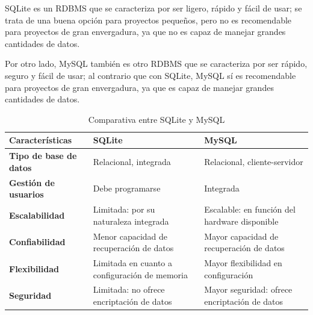                 SQLite es un RDBMS \cite{sqlite} que se caracteriza por ser ligero, rápido y fácil de usar; se trata de una buena opción para proyectos pequeños, pero no es recomendable para proyectos de gran envergadura, ya que no es capaz de manejar grandes cantidades de datos.
                
                Por otro lado, MySQL también es otro RDBMS \cite{mysql} que se caracteriza por ser rápido, seguro y fácil de usar; al contrario que con SQLite, MySQL sí es recomendable para proyectos de gran envergadura, ya que es capaz de manejar grandes cantidades de datos.

                \begin{table}[h]
                    \centering
                    
                    \begin{tabular}{|>{\centering\arraybackslash}m{4cm}|>{\centering\arraybackslash}m{5cm}|>{\centering\arraybackslash}m{5cm}|}
                        \hline
                        \textbf{Características} & \textbf{SQLite} & \textbf{MySQL} \\
                        \hline
                        \hline
                        \textbf{Tipo de base de datos} & Relacional, integrada & Relacional, cliente-servidor \\
                        \hline
                        \textbf{Gestión de usuarios} & Debe programarse & Integrada \\
                        \hline
                        \textbf{Escalabilidad} & Limitada: por su naturaleza integrada & Escalable: en función del hardware disponible \\
                        \hline
                        \textbf{Confiabilidad} & Menor capacidad de recuperación de datos & Mayor capacidad de recuperación de datos \\
                        \hline
                        \textbf{Flexibilidad} & Limitada en cuanto a configuración de memoria & Mayor flexibilidad en configuración \\
                        \hline
                        \textbf{Seguridad} & Limitada: no ofrece encriptación de datos & Mayor seguridad: ofrece encriptación de datos \\
                        \hline
                    \end{tabular}
                        
                    \caption{Comparativa entre SQLite y MySQL}
                    \label{tabla:mysql-vs-sqlite}
                \end{table}

